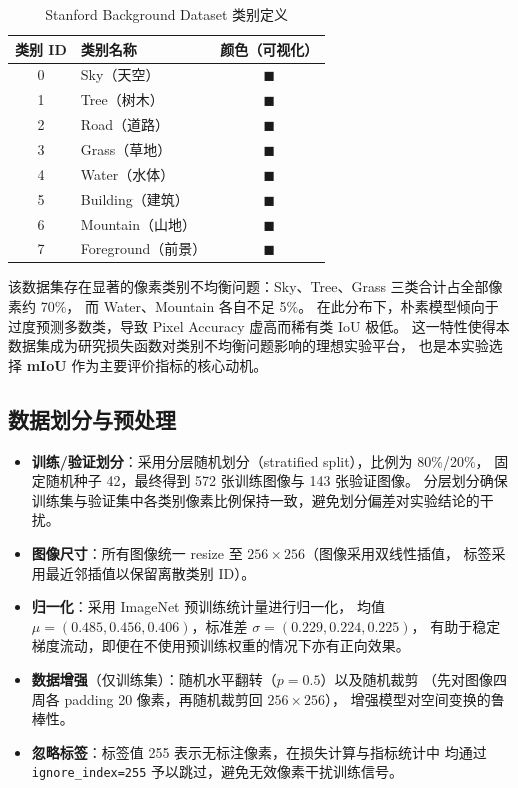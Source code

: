 \documentclass[12pt, a4paper]{article}
\begin{document}
\begin{table}[H]
    \centering
    \caption{Stanford Background Dataset 类别定义}
    \label{tab:classes}
    \begin{tabular}{clc}
        \toprule
        类别 ID & 类别名称 & 颜色（可视化） \\
        \midrule
        0 & Sky（天空）       & \textcolor[RGB]{128,128,255}{$\blacksquare$} \\
        1 & Tree（树木）      & \textcolor[RGB]{34,139,34}{$\blacksquare$} \\
        2 & Road（道路）      & \textcolor[RGB]{128,128,128}{$\blacksquare$} \\
        3 & Grass（草地）     & \textcolor[RGB]{124,252,0}{$\blacksquare$} \\
        4 & Water（水体）     & \textcolor[RGB]{0,191,255}{$\blacksquare$} \\
        5 & Building（建筑）  & \textcolor[RGB]{210,105,30}{$\blacksquare$} \\
        6 & Mountain（山地）  & \textcolor[RGB]{139,90,43}{$\blacksquare$} \\
        7 & Foreground（前景）& \textcolor[RGB]{255,165,0}{$\blacksquare$} \\
        \bottomrule
    \end{tabular}
\end{table}

该数据集存在显著的像素类别不均衡问题：Sky、Tree、Grass 三类合计占全部像素约 70\%，
而 Water、Mountain 各自不足 5\%。
在此分布下，朴素模型倾向于过度预测多数类，导致 Pixel Accuracy 虚高而稀有类 IoU 极低。
这一特性使得本数据集成为研究损失函数对类别不均衡问题影响的理想实验平台，
也是本实验选择 \textbf{mIoU} 作为主要评价指标的核心动机。

\subsection{数据划分与预处理}

\begin{itemize}
    \item \textbf{训练/验证划分}：采用分层随机划分（stratified split），比例为 80\%/20\%，
          固定随机种子 42，最终得到 572 张训练图像与 143 张验证图像。
          分层划分确保训练集与验证集中各类别像素比例保持一致，避免划分偏差对实验结论的干扰。
    \item \textbf{图像尺寸}：所有图像统一 resize 至 $256 \times 256$（图像采用双线性插值，
          标签采用最近邻插值以保留离散类别 ID）。
    \item \textbf{归一化}：采用 ImageNet 预训练统计量进行归一化，
          均值 $\mu = (0.485, 0.456, 0.406)$，标准差 $\sigma = (0.229, 0.224, 0.225)$，
          有助于稳定梯度流动，即便在不使用预训练权重的情况下亦有正向效果。
    \item \textbf{数据增强}（仅训练集）：随机水平翻转（$p=0.5$）以及随机裁剪
          （先对图像四周各 padding 20 像素，再随机裁剪回 $256\times256$），
          增强模型对空间变换的鲁棒性。
    \item \textbf{忽略标签}：标签值 255 表示无标注像素，在损失计算与指标统计中
          均通过 \texttt{ignore\_index=255} 予以跳过，避免无效像素干扰训练信号。
\end{itemize}
\end{document}
